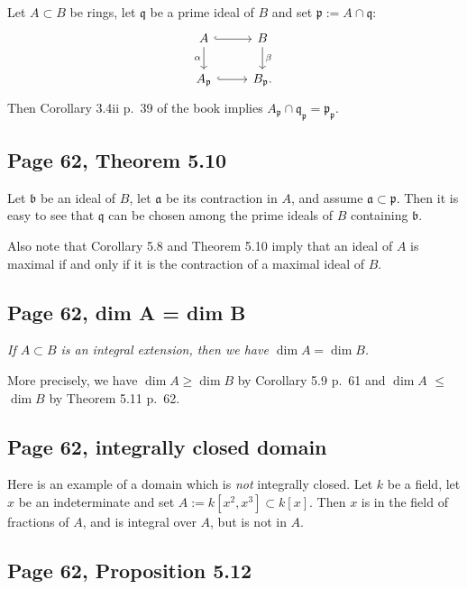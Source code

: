 \documentclass[parskip=half,fontsize=12pt]{scrartcl}%
\newcommand{\mf}{\mathfrak}
\newcommand{\aaa}{\mf a}
\newcommand{\bbb}{\mf b}
\newcommand{\ppp}{\mf p}
\newcommand{\qqq}{\mf q}
\begin{document}
Let $A\subset B$ be rings, let $\qqq$ be a prime ideal of $B$ and set $\ppp:=A\cap\qqq$:
$$
\begin{tikzcd}
A\ar[d,"\alpha"']\ar[r,hook]&B\ar[d,"\beta"]\\ 
A_\ppp\ar[r,hook]&B_\ppp.
\end{tikzcd}
$$
Then Corollary 3.4ii p.~39 of the book implies $A_\ppp\cap\qqq_\ppp=\ppp_\ppp$.

\subsection{Page 62, Theorem 5.10}\label{510}%

Let $\bbb$ be an ideal of $B$, let $\aaa$ be its contraction in $A$, and assume $\aaa\subset\ppp$. Then it is easy to see that $\qqq$ can be chosen among the prime ideals of $B$ containing $\bbb$. 

Also note that Corollary 5.8 and Theorem 5.10 imply that an ideal of $A$ is maximal if and only if it is the contraction of a maximal ideal of $B$. 

\subsection{Page 62, dim A = dim B}%

\emph{If $A\subset B$ is an integral extension, then we have $\dim A=\dim B$.}

More precisely, we have $\dim A\ge\dim B$ by Corollary 5.9 p.~61 and $\dim A$ $\le$ $\dim B$ by Theorem 5.11 p.~62.

\subsection{Page 62, integrally closed domain}%

Here is an example of a domain which is \emph{not} integrally closed. Let $k$ be a field, let $x$ be an indeterminate and set $A:=k[x^2,x^3]\subset k[x]$. Then $x$ is in the field of fractions of $A$, and is integral over $A$, but is not in $A$.

\subsection{Page 62, Proposition 5.12}\label{512}%
\end{document}
